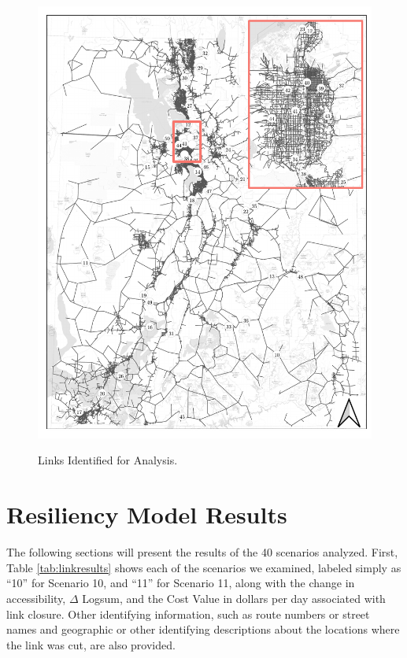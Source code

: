 \begin{figure}

{\centering \includegraphics[width=0.95\linewidth]{figures/chapter4/resiliency_links_map.pdf}}

\caption{Links Identified for Analysis.}
\label{fig:linksmap}
\end{figure}

\section{Resiliency Model Results}

The following sections will present the results of the 40 scenarios analyzed.
First, Table \ref{tab:linkresults} shows each of the scenarios we examined,
labeled simply as ``10'' for Scenario 10, and ``11'' for Scenario 11, along with the
change in accessibility, $\Delta$ Logsum, and the Cost Value in dollars per day
associated with link closure. Other identifying information, such as route
numbers or street names and geographic or other identifying descriptions about
the locations where the link was cut, are also provided.

